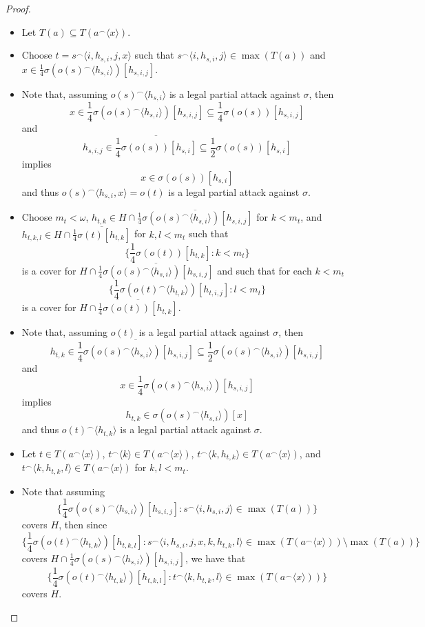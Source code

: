 \documentclass{amsart}
\theoremstyle{definition}
\theoremstyle{remark}
\newcommand{\<}{\langle}
\renewcommand{\>}{\rangle}
\newcommand{\cl}[1]{\overline{#1}}
\newcommand{\concat}{^\frown}
\begin{document}
\begin{proof}
  \begin{itemize}
    \item Let $T(a)\subseteq T(a\concat\<x\>)$.
    \item Choose $t=s\concat\<i,h_{s,i},j,x\>$ such that $s\concat\<i,h_{s,i},j\>\in\max(T(a))$ and $x\in \frac{1}{4}\sigma(o(s)\concat\<h_{s,i}\>)[h_{s,i,j}]$. 
    \item Note that, assuming $o(s)\concat\<h_{s,i}\>$ is a legal partial attack against $\sigma$, then
      \[
        x
          \in 
        \frac{1}{4}\sigma(o(s)\concat\<h_{s,i}\>)[h_{s,i,j}]
          \subseteq
        \frac{1}{4}\sigma(o(s))[h_{s,i,j}]
      \]
    and
      \[
        h_{s,i,j}
          \in 
        \cl{\frac{1}{4}\sigma(o(s))[h_{s,i}]}
          \subseteq 
        \frac{1}{2}\sigma(o(s))[h_{s,i}]
      \]
    implies
      \[
        x
          \in 
        \sigma(o(s))[h_{s,i}]
      \]
    and thus $o(s)\concat\<h_{s,i},x\>=o(t)$ is a legal partial attack against $\sigma$.
    \item Choose $m_t<\omega$, $h_{t,k}\in H\cap \cl{\frac{1}{4}\sigma(o(s)\concat\<h_{s,i}\>)[h_{s,i,j}]}$ for $k<m_t$, and $h_{t,k,l}\in H\cap\cl{\frac{1}{4}\sigma(t)[h_{t,k}]}$ for $k,l<m_t$ such that
      \[
        \{\frac{1}{4}\sigma(o(t))[h_{t,k}]:k<m_t\}
      \]
    is a cover for $H\cap \cl{\frac{1}{4}\sigma(o(s)\concat\<h_{s,i}\>)[h_{s,i,j}]}$ and such that for each $k<m_t$
      \[
        \{\frac{1}{4}\sigma(o(t)\concat\<h_{t,k}\>)[h_{t,i,j}]:l<m_t\}
      \]
    is a cover for $H\cap\cl{\frac{1}{4}\sigma(o(t))[h_{t,k}]}$.
    \item Note that, assuming $o(t)$ is a legal partial attack against $\sigma$, then
      \[
        h_{t,k}
          \in 
        \cl{\frac{1}{4}\sigma(o(s)\concat\<h_{s,i}\>)[h_{s,i,j}]}
          \subseteq
        \frac{1}{2}\sigma(o(s)\concat\<h_{s,i}\>)[h_{s,i,j}]
      \]
    and
      \[
        x
          \in 
        \frac{1}{4}\sigma(o(s)\concat\<h_{s,i}\>)[h_{s,i,j}]
      \]
    implies
      \[
        h_{t,k}
          \in
        \sigma(o(s)\concat\<h_{s,i}\>)[x]
      \]
    and thus $o(t)\concat\<h_{t,k}\>$ is a legal partial attack against $\sigma$.
    \item Let $t\in T(a\concat\<x\>)$, $t\concat\<k\>\in T(a\concat\<x\>)$, $t\concat\<k,h_{t,k}\>\in T(a\concat\<x\>)$, and $t\concat\<k,h_{t,k},l\>\in T(a\concat\<x\>)$ for $k,l<m_t$.
    \item Note that assuming
      \[
        \{\frac{1}{4}\sigma(o(s)\concat\<h_{s,i}\>)[h_{s,i,j}] : s\concat\<i,h_{s,i},j\>\in\max(T(a))\}
      \]
    covers $H$, then since
      \[
        \{\frac{1}{4}\sigma(o(t)\concat\<h_{t,k}\>)[h_{t,k,l}] : s\concat\<i,h_{s,i},j,x,k,h_{t,k},l\>\in\max(T(a\concat\<x\>))\setminus\max(T(a))\}
      \]
    covers $H\cap \frac{1}{4}\sigma(o(s)\concat\<h_{s,i}\>)[h_{s,i,j}]$, we have that
      \[
        \{\frac{1}{4}\sigma(o(t)\concat\<h_{t,k}\>)[h_{t,k,l}] : t\concat\<k,h_{t,k},l\>\in\max(T(a\concat\<x\>))\}
      \]
    covers $H$.
  \end{itemize}


\end{proof}
\end{document}
